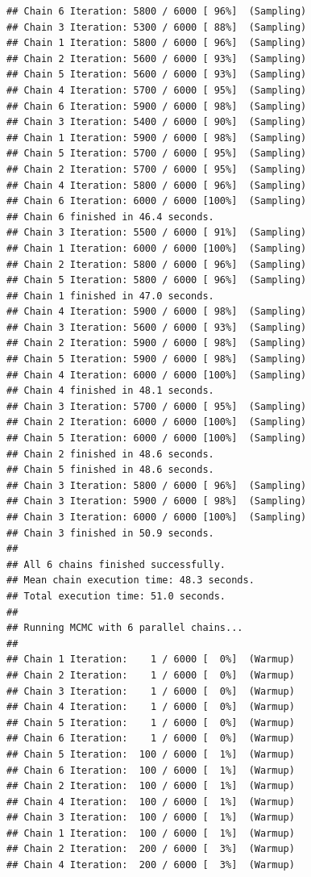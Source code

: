 \documentclass[
]{article}
\begin{document}
\begin{verbatim}
## Chain 6 Iteration: 5800 / 6000 [ 96%]  (Sampling) 
## Chain 3 Iteration: 5300 / 6000 [ 88%]  (Sampling) 
## Chain 1 Iteration: 5800 / 6000 [ 96%]  (Sampling) 
## Chain 2 Iteration: 5600 / 6000 [ 93%]  (Sampling) 
## Chain 5 Iteration: 5600 / 6000 [ 93%]  (Sampling) 
## Chain 4 Iteration: 5700 / 6000 [ 95%]  (Sampling) 
## Chain 6 Iteration: 5900 / 6000 [ 98%]  (Sampling) 
## Chain 3 Iteration: 5400 / 6000 [ 90%]  (Sampling) 
## Chain 1 Iteration: 5900 / 6000 [ 98%]  (Sampling) 
## Chain 5 Iteration: 5700 / 6000 [ 95%]  (Sampling) 
## Chain 2 Iteration: 5700 / 6000 [ 95%]  (Sampling) 
## Chain 4 Iteration: 5800 / 6000 [ 96%]  (Sampling) 
## Chain 6 Iteration: 6000 / 6000 [100%]  (Sampling) 
## Chain 6 finished in 46.4 seconds.
## Chain 3 Iteration: 5500 / 6000 [ 91%]  (Sampling) 
## Chain 1 Iteration: 6000 / 6000 [100%]  (Sampling) 
## Chain 2 Iteration: 5800 / 6000 [ 96%]  (Sampling) 
## Chain 5 Iteration: 5800 / 6000 [ 96%]  (Sampling) 
## Chain 1 finished in 47.0 seconds.
## Chain 4 Iteration: 5900 / 6000 [ 98%]  (Sampling) 
## Chain 3 Iteration: 5600 / 6000 [ 93%]  (Sampling) 
## Chain 2 Iteration: 5900 / 6000 [ 98%]  (Sampling) 
## Chain 5 Iteration: 5900 / 6000 [ 98%]  (Sampling) 
## Chain 4 Iteration: 6000 / 6000 [100%]  (Sampling) 
## Chain 4 finished in 48.1 seconds.
## Chain 3 Iteration: 5700 / 6000 [ 95%]  (Sampling) 
## Chain 2 Iteration: 6000 / 6000 [100%]  (Sampling) 
## Chain 5 Iteration: 6000 / 6000 [100%]  (Sampling) 
## Chain 2 finished in 48.6 seconds.
## Chain 5 finished in 48.6 seconds.
## Chain 3 Iteration: 5800 / 6000 [ 96%]  (Sampling) 
## Chain 3 Iteration: 5900 / 6000 [ 98%]  (Sampling) 
## Chain 3 Iteration: 6000 / 6000 [100%]  (Sampling) 
## Chain 3 finished in 50.9 seconds.
## 
## All 6 chains finished successfully.
## Mean chain execution time: 48.3 seconds.
## Total execution time: 51.0 seconds.
## 
## Running MCMC with 6 parallel chains...
## 
## Chain 1 Iteration:    1 / 6000 [  0%]  (Warmup) 
## Chain 2 Iteration:    1 / 6000 [  0%]  (Warmup) 
## Chain 3 Iteration:    1 / 6000 [  0%]  (Warmup) 
## Chain 4 Iteration:    1 / 6000 [  0%]  (Warmup) 
## Chain 5 Iteration:    1 / 6000 [  0%]  (Warmup) 
## Chain 6 Iteration:    1 / 6000 [  0%]  (Warmup) 
## Chain 5 Iteration:  100 / 6000 [  1%]  (Warmup) 
## Chain 6 Iteration:  100 / 6000 [  1%]  (Warmup) 
## Chain 2 Iteration:  100 / 6000 [  1%]  (Warmup) 
## Chain 4 Iteration:  100 / 6000 [  1%]  (Warmup) 
## Chain 3 Iteration:  100 / 6000 [  1%]  (Warmup) 
## Chain 1 Iteration:  100 / 6000 [  1%]  (Warmup) 
## Chain 2 Iteration:  200 / 6000 [  3%]  (Warmup) 
## Chain 4 Iteration:  200 / 6000 [  3%]  (Warmup) 

\end{verbatim}
\end{document}
